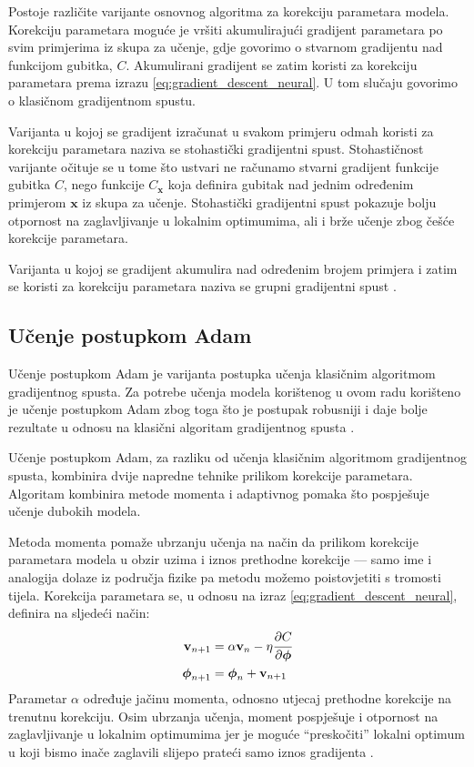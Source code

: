 \documentclass[times, utf8, diplomski, numeric]{fer}
\begin{document}
Postoje različite varijante osnovnog algoritma za korekciju parametara modela. 
Korekciju parametara moguće je vršiti akumulirajući gradijent parametara po svim primjerima iz skupa za učenje, gdje govorimo o stvarnom gradijentu nad funkcijom gubitka, $C$. 
Akumulirani gradijent se zatim koristi za korekciju parametara prema izrazu \ref{eq:gradient_descent_neural}. U tom slučaju govorimo o klasičnom gradijentnom spustu.

Varijanta u kojoj se gradijent izračunat u svakom primjeru odmah koristi za korekciju parametara naziva se stohastički gradijentni spust. 
Stohastičnost varijante očituje se u tome što ustvari ne računamo stvarni gradijent funkcije gubitka $C$, nego funkcije $C_\mathbf{x}$ koja definira gubitak nad jednim određenim primjerom $\mathbf{x}$ iz skupa za učenje.
Stohastički gradijentni spust pokazuje bolju otpornost na zaglavljivanje u lokalnim optimumima, ali i brže učenje zbog češće korekcije parametara.

Varijanta u kojoj se gradijent akumulira nad određenim brojem primjera i zatim se koristi za korekciju parametara naziva se grupni  gradijentni spust \citep{seminar:rela}.

\subsection{Učenje postupkom Adam}
Učenje postupkom Adam je varijanta postupka učenja klasičnim algoritmom gradijentnog spusta.
Za potrebe učenja modela korištenog u ovom radu korišteno je učenje postupkom Adam zbog toga što je postupak robusniji i daje bolje rezultate u odnosu na klasični algoritam gradijentnog spusta \citep{article:adam}. 

Učenje postupkom Adam, za razliku od učenja klasičnim algoritmom gradijentnog spusta, kombinira dvije napredne tehnike prilikom korekcije parametara. 
Algoritam kombinira metode momenta i adaptivnog pomaka što pospješuje učenje dubokih modela.

Metoda momenta pomaže ubrzanju učenja na način da prilikom korekcije parametara modela u obzir uzima i iznos prethodne korekcije --- samo ime i analogija dolaze iz područja fizike pa metodu možemo poistovjetiti s tromosti tijela.
Korekcija parametara se, u odnosu na izraz \ref{eq:gradient_descent_neural}, definira na sljedeći način:
\begin{align}
\mathbf{v}_{n+1} &= \alpha \mathbf{v}_{n} - \eta \cfrac{\partial C}{\partial \boldsymbol{\phi}} \\
 \boldsymbol{\phi}_{n+1} &= \boldsymbol{\phi}_n + \mathbf{v}_{n+1}
\end{align} 
Parametar $\alpha$ određuje jačinu momenta, odnosno utjecaj prethodne korekcije na trenutnu korekciju.
Osim ubrzanja učenja, moment pospješuje i otpornost na zaglavljivanje u lokalnim optimumima jer je moguće ``preskočiti'' lokalni optimum u koji bismo inače zaglavili slijepo prateći samo iznos gradijenta \citep{book:deeplearningbook} \citep{seminar:rela}.
\end{document}
